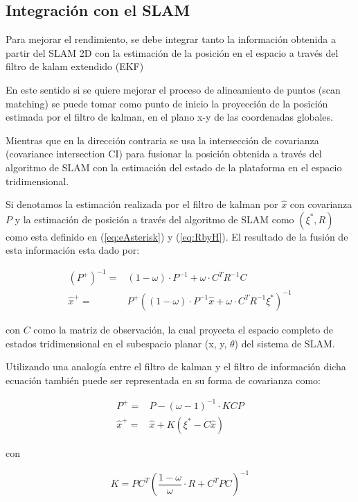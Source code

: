 \documentclass[10pt,a4paper]{article}
\begin{document}
\subsection{Integración con el SLAM}

Para mejorar el rendimiento, se debe integrar tanto la información obtenida a partir del SLAM 2D con la estimación de la posición en el espacio a través del filtro de kalam extendido (EKF)

En este sentido si se quiere mejorar el proceso de alineamiento de puntos (scan matching) se puede tomar como punto de inicio la proyección de la posición estimada por el filtro de kalman, en el plano x-y de las coordenadas globales.

Mientras que en la dirección contraria se usa la intersección de covarianza (covariance intersection CI) para fusionar la posición obtenida a través del algoritmo de SLAM con la estimación del estado de la plataforma en el espacio tridimensional.

Si denotamos la estimación realizada por el filtro de kalman por $ \hat{x} $ con covarianza $ P $ y la estimación de posición a través del algoritmo de SLAM como $ (\xi^{*}, R) $ como esta definido en (\ref{eq:eAsterisk}) y (\ref{eq:RbyH}). El resultado de la fusión de esta información esta dado por:

\begin{align}
		(P^{+})^{-1} = 
			& (1-\omega) \cdot P^{-1} + \omega \cdot C^{T}R^{-1}C
		\\
		\hat{x}^{+} =
			& P^{+}\left( (1-\omega) \cdot P^{-1} \hat{x} + 
				\omega \cdot C^{T}R^{-1} \xi^{*} \right)^{-1}
\end{align}

con $ C $ como la matriz de observación, la cual proyecta el espacio completo de estados tridimensional en el subespacio planar (x, y, $ \theta $) del sistema de SLAM.

Utilizando una analogía entre el filtro de kalman y el filtro de información dicha ecuación también puede ser representada en su forma de covarianza como: 

\begin{align}
	P^{+} =
		& P - (\omega - 1)^{-1} \cdot KCP
	\\
	\hat{x}^{+} =
		& \hat{x} + K ( \xi^{*} - C \hat{x} )
\end{align}

con

\begin{equation}
	K = P C^{T} \left(
		\frac{1 - \omega}{\omega} \cdot R + C^{T} P C \right)^{-1}
\end{equation}
\end{document}
